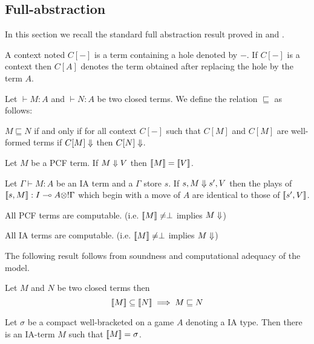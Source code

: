 \subsection{Full-abstraction}
In this section we recall the standard full abstraction result proved in  \cite{abramsky94full}
and \cite{hylandong_pcf}.

A context noted $C[-]$ is a term containing a hole denoted by $-$. If $C[-]$ is a context then $C[A]$ denotes the term obtained
after replacing the hole by the term $A$.

\begin{dfn}
Let $\vdash M : A$ and $\vdash N : A$ be two closed terms. We define the relation $\sqsubseteq$ as follows:


$M \sqsubseteq N$ if and only if for all context $C[-]$ such that $C[M]$ and $C[M]$ are well-formed terms if
$C[M] \Downarrow$ then $C[N] \Downarrow$.
\end{dfn}


\begin{lem} Let $M$ be a PCF term.
If $M \Downarrow V$ then ${[\![ M ]\!]} = {[\![ V ]\!]}$.
\end{lem}

\begin{lem} Let $\Gamma \vdash M : A$ be an IA term and a $\Gamma$ store $s$.
If $s,M \Downarrow s',V$ then the plays of ${[\![ s,M ]\!]} : I \multimap A \otimes !\Gamma$ which begin
with a move of $A$ are identical to those of ${[\![ s',V ]\!]}$.
\end{lem}


\begin{lem}
All PCF terms are computable. (i.e. ${[\![ M ]\!]} \neq \perp$ implies $M \Downarrow$)
\end{lem}

\begin{lem}
All IA terms are computable. (i.e. ${[\![ M ]\!]} \neq \perp$ implies $M \Downarrow$)
\end{lem}


The following result follows from soundness and computational adequacy of the model.
\begin{prop}
\label{prop:ineqsoundness}
Let $M$ and $N$ be two closed terms then
$${[\![ M ]\!]} \subseteq {[\![N ]\!]} \implies  M \sqsubseteq N $$
\end{prop}

\begin{prop}[Definability]
\label{prop:definability}
Let $\sigma$ be a compact well-bracketed on a game $A$ denoting a IA type. Then there is
an IA-term $M$ such that ${[\![ M ]\!]} = \sigma$.
\end{prop}

